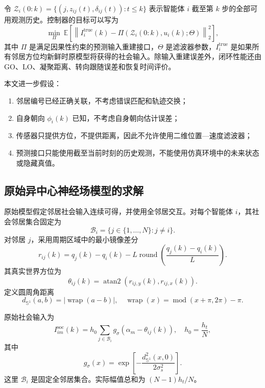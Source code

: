 \documentclass[UTF8,fontset=windows,11pt]{ctexart}
\begin{document}
令 $\mathcal Z_i(0:k)=\{(j,z_{ij}(t),\delta_{ij}(t)):t\le k\}$ 表示智能体 $i$ 截至第 $k$ 步的全部可用观测历史。控制器的目标可以写为
\begin{equation}
 \min_{\Pi}\ \mathbb E\left[
 \left\|I_i^{\mathrm{true}}(k)-\Pi(\mathcal Z_i(0:k),u_i(k);\Theta)\right\|_2^2
 \right],
\end{equation}
其中 $\Pi$ 是满足因果性约束的预测输入重建接口，$\Theta$ 是滤波器参数，$I_i^{\mathrm{true}}$ 是如果所有邻居方位均新鲜时原模型将获得的社会输入。除输入重建误差外，闭环性能还由 GO、LO、凝聚距离、转向跟随误差和恢复时间评价。

本文进一步假设：

\begin{enumerate}[label=(\arabic*)]
 \item 邻居编号已经正确关联，不考虑错误匹配和轨迹交换；
 \item 自身朝向 $\phi_i(k)$ 已知，不考虑自身朝向估计误差；
 \item 传感器只提供方位，不提供距离，因此不允许使用二维位置—速度滤波器；
 \item 预测接口只能使用截至当前时刻的历史观测，不能使用仿真环境中的未来状态或隐藏真值。
\end{enumerate}

\subsection{原始异中心神经场模型的求解}

原始模型假定邻居社会输入连续可得，并使用全邻居交互。对每个智能体 $i$，其社会邻居集合固定为
\begin{equation}
 \mathcal B_i=\{j\in\{1,\ldots,N\}:j\ne i\}.
\end{equation}
对邻居 $j$，采用周期区域中的最小镜像差分
\begin{equation}
 r_{ij}(k)=q_j(k)-q_i(k)-L\operatorname{round}\left(\frac{q_j(k)-q_i(k)}{L}\right).
\end{equation}
其真实世界方位为
\begin{equation}
 \theta_{ij}(k)=\operatorname{atan2}(r_{ij,y}(k),r_{ij,x}(k)).
\end{equation}
定义圆周角距离
\begin{equation}
 d_{\mathbb S^1}(a,b)=\left|\operatorname{wrap}(a-b)\right|,
\quad \operatorname{wrap}(x)=\operatorname{mod}(x+\pi,2\pi)-\pi.
\end{equation}

原始社会输入为
\begin{equation}
 I^{\mathrm{soc}}_{im}(k)=h_0\sum_{j\in\mathcal B_i}
 g_\sigma\left(\alpha_m-\theta_{ij}(k)\right),
 \quad h_0=\frac{h_t}{N},
\end{equation}
其中
\begin{equation}
 g_\sigma(x)=\exp\left[-\frac{d_{\mathbb S^1}^2(x,0)}{2\sigma_s^2}\right].
\end{equation}
这里 $\mathcal B_i$ 是固定全邻居集合。实际幅值总和为 $(N-1)h_t/N$。
\end{document}
